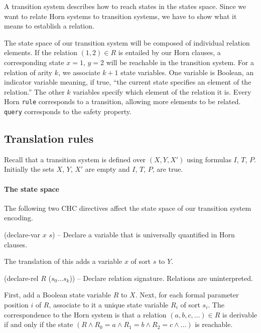 \documentclass{article}
\begin{document}
A transition system describes how to reach states in the states space.
Since we want to relate Horn systems to transition systems, we have to show what it means to
establish a relation.

The state space of our transition system will be composed of individual relation elements.
If the relation $(1,2)\in R$ is entailed by our Horn clauses, a corresponding state $x=1$, $y=2$ will be reachable in the transition system.
For a relation of arity $k$, we associate $k+1$ state variables.
One variable is Boolean, an indicator variable meaning, if true, ``the current state specifies an element of the relation.''
The other $k$ variables specify which element of the relation it is.
Every Horn \texttt{rule} corresponds to a transition, allowing more elements to be related.
\texttt{query} corresponds to the safety property.

\hypertarget{translation-rules}{%
\subsection{Translation rules}\label{translation-rules}}

Recall that a transition system is defined over $(X, Y, X')$ using
formulas $I$, $T$, $P$. Initially the sets $X$, $Y$, $X'$ are empty and $I$, $T$, $P$,
are true.

\paragraph{The state space}
The following two CHC directives affect the state space of our transition system encoding.
\begin{center}
(declare-var $x$ $s$) -- Declare a variable that is universally quantified in Horn clauses.
\end{center}

The translation of this adds a variable $x$ of sort $s$ to $Y$.

\begin{center}
(declare-rel $R$ ($s_0 \ldots s_k$))  -- Declare relation signature. Relations are uninterpreted.
\end{center}

First, add a Boolean state variable $R$ to $X$. Next, for each formal
parameter position {$i$} of $R$, associate to it a unique
state variable $R_i$ of sort $s_i$. 
The correspondence to the Horn system is that a relation $(a,b,c,\ldots)\in R$ is derivable if and only if the state $(R \wedge R_0 = a \wedge R_1 = b \wedge R_2 = c \wedge \ldots)$ is reachable.
\end{document}
